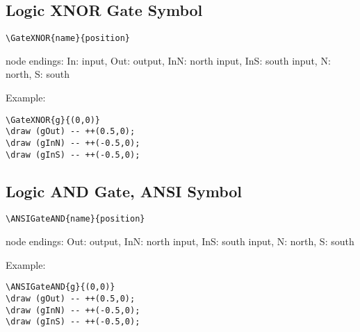 \documentclass[parskip=full]{scrartcl}
\begin{document}
\subsection{Logic XNOR Gate Symbol}

\begin{verbatim}
\GateXNOR{name}{position}
\end{verbatim}
node endings: In: input, Out: output,
              InN: north input, InS: south input,
              N: north, S: south

Example:\\
\begin{minipage}{0.8\textwidth}
\begin{verbatim}
\GateXNOR{g}{(0,0)}
\draw (gOut) -- ++(0.5,0);
\draw (gInN) -- ++(-0.5,0);
\draw (gInS) -- ++(-0.5,0);
\end{verbatim}
\end{minipage}
\begin{minipage}{0.19\textwidth}
\end{minipage}

\subsection{Logic AND Gate, ANSI Symbol}

\begin{verbatim}
\ANSIGateAND{name}{position}
\end{verbatim}
node endings: Out: output,
              InN: north input, InS: south input,
              N: north, S: south

Example:\\
\begin{minipage}{0.8\textwidth}
\begin{verbatim}
\ANSIGateAND{g}{(0,0)}
\draw (gOut) -- ++(0.5,0);
\draw (gInN) -- ++(-0.5,0);
\draw (gInS) -- ++(-0.5,0);
\end{verbatim}
\end{minipage}
\begin{minipage}{0.19\textwidth}
\end{minipage}
\end{document}
